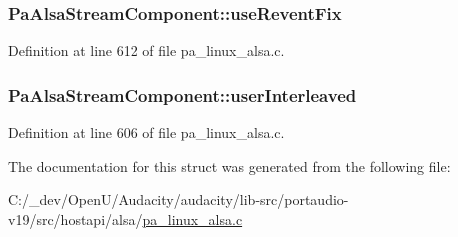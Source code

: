 \subsubsection[{\texorpdfstring{use\+Revent\+Fix}{useReventFix}}]{ Pa\+Alsa\+Stream\+Component\+::use\+Revent\+Fix}\hypertarget{struct_pa_alsa_stream_component_a306ed4d1f073e1edad9e3dcc76e38809}{}\label{struct_pa_alsa_stream_component_a306ed4d1f073e1edad9e3dcc76e38809}


Definition at line 612 of file pa\+\_\+linux\+\_\+alsa.\+c.

\subsubsection[{\texorpdfstring{user\+Interleaved}{userInterleaved}}]{ Pa\+Alsa\+Stream\+Component\+::user\+Interleaved}\hypertarget{struct_pa_alsa_stream_component_aae34cf96e56f05ce576baa7df06d5045}{}\label{struct_pa_alsa_stream_component_aae34cf96e56f05ce576baa7df06d5045}


Definition at line 606 of file pa\+\_\+linux\+\_\+alsa.\+c.



The documentation for this struct was generated from the following file\+:\begin{DoxyCompactItemize}
\item 
C\+:/\+\_\+dev/\+Open\+U/\+Audacity/audacity/lib-\/src/portaudio-\/v19/src/hostapi/alsa/\hyperlink{pa__linux__alsa_8c}{pa\+\_\+linux\+\_\+alsa.\+c}\end{DoxyCompactItemize}
